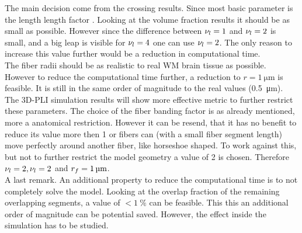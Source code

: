 The main decision come from the crossing results.
Since most basic parameter is the length length factor \segLengthFactor{}.
Looking at the volume fraction results it should be as small as possible.
However since the difference between $\textnormal{$\nu_{l}$}=\SI{1}{}$ and $\textnormal{$\nu_{l}$}=\SI{2}{}$ is small, and a big leap is visible for $\textnormal{$\nu_{l}$}=\SI{4}{}$ one can use $\textnormal{$\nu_{l}$}=\SI{2}{}$.
The only reason to increase this value further would be a reduction in computational time.
\\
% 
The fiber radii should be as realistic to real \acs{WM} brain tissue as possible.
However to reduce the computational time further, a reduction to $r = \SI{1}{\micro\meter}$ is feasible.
It is still in the same order of magnitude to the real values (\SI{0.5}{\micro\meter}).
The \ac{3D-PLI} simulation results will show more effective metric to further restrict these parameters.
% 
The choice of the fiber banding factor is as already mentioned, more a anatomical restriction.
However it can be resend, that it has no benefit to reduce its value more then 1 or fibers can (with a small fiber segment length) move perfectly around another fiber, like horseshoe shaped.
To work against this, but not to further restrict the model geometry a value of 2 is chosen.
Therefore $\textnormal{$\nu_{l}$} = \SI{2}{}, \textnormal{$\nu_{l}$}=\SI{2}{}$ and $\fiberRadius=\SI{1}{\micro\meter}$.
\\
% 
A last remark.
An additional property to reduce the computational time is to not completely solve the model. 
Looking at the overlap fraction of the remaining overlapping segments, a value of $<\SI{1}{\percent}$ can be feasible.
This this an additional order of magnitude can be potential saved.
However, the effect inside the simulation has to be studied.
% 
% 
% 

